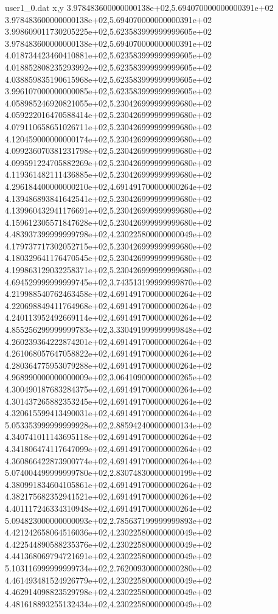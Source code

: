 \begin{filecontents}{user1_0.dat}
x,y
3.978483600000000138e+02,5.694070000000000391e+02
3.978483600000000138e+02,5.694070000000000391e+02
3.998609011730205225e+02,5.623583999999999605e+02
3.978483600000000138e+02,5.694070000000000391e+02
4.018734423460410881e+02,5.623583999999999605e+02
4.018852808235293992e+02,5.623583999999999605e+02
4.038859835190615968e+02,5.623583999999999605e+02
3.996107000000000085e+02,5.623583999999999605e+02
4.058985246920821055e+02,5.230426999999999680e+02
4.059222016470588414e+02,5.230426999999999680e+02
4.079110658651026711e+02,5.230426999999999680e+02
4.120459000000000174e+02,5.230426999999999680e+02
4.099236070381231798e+02,5.230426999999999680e+02
4.099591224705882269e+02,5.230426999999999680e+02
4.119361482111436885e+02,5.230426999999999680e+02
4.296184400000000210e+02,4.691491700000000264e+02
4.139486893841642541e+02,5.230426999999999680e+02
4.139960432941176691e+02,5.230426999999999680e+02
4.159612305571847628e+02,5.230426999999999680e+02
4.483937399999999798e+02,4.230225800000000049e+02
4.179737717302052715e+02,5.230426999999999680e+02
4.180329641176470545e+02,5.230426999999999680e+02
4.199863129032258371e+02,5.230426999999999680e+02
4.694529999999999745e+02,3.743513199999999870e+02
4.219988540762463458e+02,4.691491700000000264e+02
4.220698849411764968e+02,4.691491700000000264e+02
4.240113952492669114e+02,4.691491700000000264e+02
4.855256299999999783e+02,3.330491999999999848e+02
4.260239364222874201e+02,4.691491700000000264e+02
4.261068057647058822e+02,4.691491700000000264e+02
4.280364775953079288e+02,4.691491700000000264e+02
4.968990000000000009e+02,3.064109000000000265e+02
4.300490187683284375e+02,4.691491700000000264e+02
4.301437265882353245e+02,4.691491700000000264e+02
4.320615599413490031e+02,4.691491700000000264e+02
5.053353999999999928e+02,2.885942400000000134e+02
4.340741011143695118e+02,4.691491700000000264e+02
4.341806474117647099e+02,4.691491700000000264e+02
4.360866422873900774e+02,4.691491700000000264e+02
5.074004499999999780e+02,2.830748300000000199e+02
4.380991834604105861e+02,4.691491700000000264e+02
4.382175682352941521e+02,4.691491700000000264e+02
4.401117246334310948e+02,4.691491700000000264e+02
5.094823000000000093e+02,2.785637199999999893e+02
4.421242658064516036e+02,4.230225800000000049e+02
4.422544890588235376e+02,4.230225800000000049e+02
4.441368069794721691e+02,4.230225800000000049e+02
5.103116999999999734e+02,2.762009300000000280e+02
4.461493481524926779e+02,4.230225800000000049e+02
4.462914098823529798e+02,4.230225800000000049e+02
4.481618893255132434e+02,4.230225800000000049e+02

\end{filecontents}

